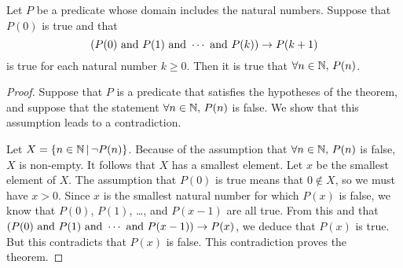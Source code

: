 \begin{theorem}
Let $P$ be a predicate whose domain includes
the natural numbers.  Suppose that $P(0)$ is true and that
\[(P(0)\text{ and } P(1)\text{ and }\cdots\text{ and } P(k))\rightarrow P(k+1)\]
is true for each natural number $k\geq 0$.  
Then it is true that $\forall n\in{\mathbb N},\,P(n)$.
\end{theorem}
\begin{proof}
Suppose that $P$ is a predicate that satisfies the hypotheses of the theorem, and suppose that the statement $\forall n\in{\mathbb N},\,P(n)$ is false.
We show that this assumption leads to a contradiction.

Let $X=\{n\in{\mathbb N}\,|\, \lnot P(n)\}$.
Because of the assumption that $\forall n\in{\mathbb N},\,P(n)$ is false, $X$ is non-empty.
It follows that $X$ has a smallest element.
Let $x$ be the smallest element of $X$.
The assumption that $P(0)$ is true means that $0\not\in X$, so we must have $x>0$.
Since $x$ is the smallest natural number for which $P(x)$ is false, we know that $P(0)$, $P(1)$, \dots, and $P(x-1)$ are all true.
From this and that $(P(0)\text{ and } P(1)\text{ and }\cdots\text{ and } P(x-1))\rightarrow P(x)$, we deduce that $P(x)$ is true.
But this contradicts that $P(x)$ is false.
This contradiction proves the theorem.
\end{proof}



